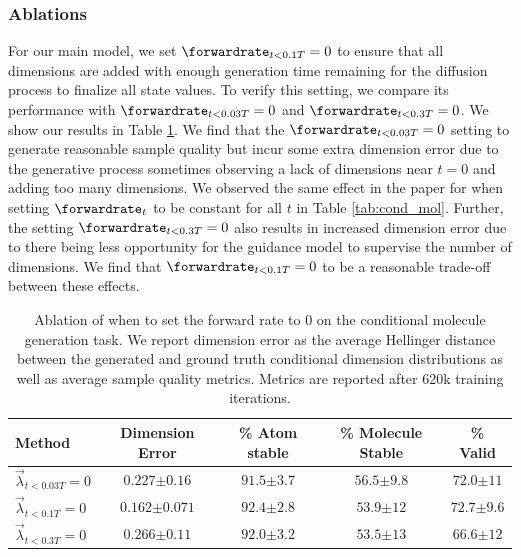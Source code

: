 \subsubsection{Ablations}
For our main model, we set $\forwardrate_{t < 0.1T} = 0$ to ensure that all dimensions are added with enough generation time remaining for the diffusion process to finalize all state values. To verify this setting, we compare its performance with $\forwardrate_{t<0.03T} = 0$ and $\forwardrate_{t<0.3T} = 0$. We show our results in Table \ref{tab:lowTablation}. We find that the $\forwardrate_{t<0.03T}=0$ setting to generate reasonable sample quality but incur some extra dimension error due to the generative process sometimes observing a lack of dimensions near $t=0$ and adding too many dimensions. We observed the same effect in the paper for when setting $\forwardrate_t$ to be constant for all $t$ in Table \ref{tab:cond_mol}. Further, the setting $\forwardrate_{t<0.3T}=0$ also results in increased dimension error due to there being less opportunity for the guidance model to supervise the number of dimensions. We find that $\forwardrate_{t<0.1T}=0$ to be a reasonable trade-off between these effects.
\begin{table}[h]
\centering
\caption{Ablation of when to set the forward rate to $0$ on the conditional molecule generation task. We report dimension error as the average Hellinger distance between the generated and ground truth conditional dimension distributions as well as average sample quality metrics. Metrics are reported after 620k training iterations.}
\begin{tabular}{@{}lcccc@{}}
\toprule
Method & Dimension  Error & \% Atom stable & \% Molecule Stable & \% Valid \\ \midrule
$ \overrightarrow{\lambda}_{t < 0.03T} = 0$ & $0.227 {\scriptstyle \pm 0.16}$ & $91.5 {\scriptstyle \pm 3.7} $  & $56.5 {\scriptstyle \pm 9.8}$ & $72.0 {\scriptstyle \pm 11}$  \\
$ \overrightarrow{\lambda}_{t < 0.1T} = 0$ & $0.162 {\scriptstyle \pm 0.071}$ & $92.4 {\scriptstyle \pm 2.8}$ & $53.9 {\scriptstyle \pm 12}$ & $72.7 {\scriptstyle \pm 9.6}$ \\
$ \overrightarrow{\lambda}_{t < 0.3T} = 0$ & $0.266 {\scriptstyle \pm 0.11}$ & $92.0 {\scriptstyle \pm 3.2}$ & $53.5 {\scriptstyle \pm 13}$ & $66.6 {\scriptstyle \pm 12}$ \\
\bottomrule
\end{tabular}
\label{tab:lowTablation}
\end{table}

